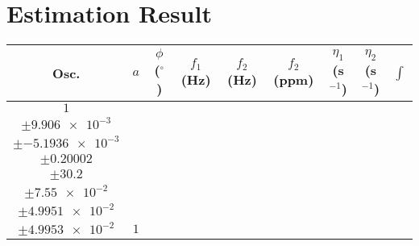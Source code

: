 \documentclass[8pt]{article}
\begin{document}
\section*{Estimation Result}
\begin{longtable}[l]{c c c c c c c c c}
\toprule
Osc. & $a$ & $\phi$ ($^{\circ}$) & $f_1$ (Hz) & $f_2$ (Hz) & $f_2$ (ppm) & $\eta_1$ (s$^{-1}$) & $\eta_2$ (s$^{-1}$) & $\int$\\
\midrule
$\num{1}$ & \begin{tabular}[c]{@{}c@{}}$\num{0.9906}$ \\ $\pm\num{9.906e-3}$\end{tabular} & \begin{tabular}[c]{@{}c@{}}$\num{-0.51936}$ \\ $\pm\num{-5.1936e-3}$\end{tabular} & \begin{tabular}[c]{@{}c@{}}$\num{20.002}$ \\ $\pm\num{0.20002}$\end{tabular} & \begin{tabular}[c]{@{}c@{}}$\num{3.02e+3}$ \\ $\pm\num{30.2}$\end{tabular} & \begin{tabular}[c]{@{}c@{}}$\num{7.55}$ \\ $\pm\num{7.55e-2}$\end{tabular} & \begin{tabular}[c]{@{}c@{}}$\num{4.9951}$ \\ $\pm\num{4.9951e-2}$\end{tabular} & \begin{tabular}[c]{@{}c@{}}$\num{4.9953}$ \\ $\pm\num{4.9953e-2}$\end{tabular} & $\num{1}$\\

\end{longtable}
\end{document}
